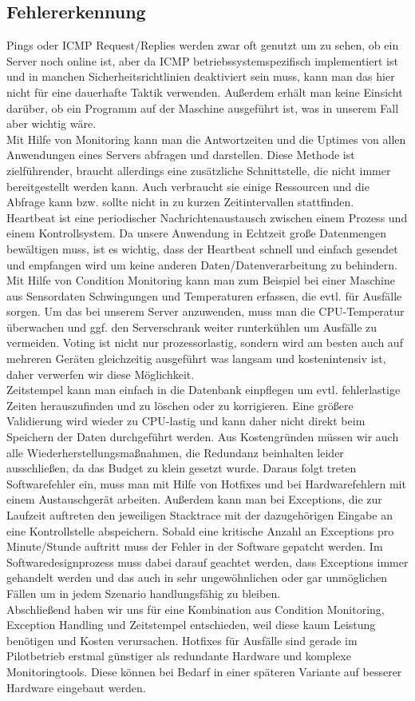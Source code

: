 \subsection{Fehlererkennung}
Pings oder ICMP Request/Replies werden zwar oft genutzt um zu sehen, ob ein Server noch online ist, aber da ICMP betriebssystemspezifisch implementiert ist und in manchen Sicherheitsrichtlinien deaktiviert sein muss, kann man das hier nicht für eine dauerhafte Taktik verwenden. Außerdem erhält man keine Einsicht darüber, ob ein Programm auf der Maschine ausgeführt ist, was in unserem Fall aber wichtig wäre. 
\\
Mit Hilfe von Monitoring kann man die Antwortzeiten und die Uptimes von allen Anwendungen eines Servers abfragen und darstellen. Diese Methode ist zielführender, braucht allerdings eine zusätzliche Schnittstelle, die nicht immer bereitgestellt werden kann. Auch verbraucht sie einige Ressourcen und die Abfrage kann bzw. sollte nicht in zu kurzen Zeitintervallen stattfinden. 
\\
Heartbeat ist eine periodischer Nachrichtenaustausch zwischen einem Prozess und einem Kontrollsystem. Da unsere Anwendung in Echtzeit große Datenmengen bewältigen muss, ist es wichtig, dass der Heartbeat schnell und einfach gesendet und empfangen wird um keine anderen Daten/Datenverarbeitung zu behindern. 
Mit Hilfe von Condition Monitoring kann man zum Beispiel bei einer Maschine aus Sensordaten Schwingungen und Temperaturen erfassen, die evtl. für Ausfälle sorgen. Um das bei unserem Server anzuwenden, muss man die CPU-Temperatur überwachen und ggf. den Serverschrank weiter runterkühlen um Ausfälle zu vermeiden. 
Voting ist nicht nur prozessorlastig, sondern wird am besten auch auf mehreren Geräten gleichzeitig ausgeführt was langsam und kostenintensiv ist, daher verwerfen wir diese Möglichkeit.
\\
Zeitstempel kann man einfach in die Datenbank einpflegen um evtl. fehlerlastige Zeiten herauszufinden und zu löschen oder zu korrigieren. Eine größere Validierung wird wieder zu CPU-lastig und kann daher nicht direkt beim Speichern der Daten durchgeführt werden.
Aus Kostengründen müssen wir auch alle Wiederherstellungsmaßnahmen, die Redundanz beinhalten leider ausschließen, da das Budget zu klein gesetzt wurde. Daraus folgt treten Softwarefehler ein, muss man mit Hilfe von Hotfixes und bei Hardwarefehlern mit einem Austauschgerät arbeiten. Außerdem kann man bei Exceptions, die zur Laufzeit auftreten den jeweiligen Stacktrace mit der dazugehörigen Eingabe an eine Kontrollstelle abspeichern. Sobald eine kritische Anzahl an Exceptions pro Minute/Stunde auftritt muss der Fehler in der Software gepatcht werden. Im Softwaredesignprozess muss dabei darauf geachtet werden, dass Exceptions immer gehandelt werden und das auch in sehr ungewöhnlichen oder gar unmöglichen Fällen um in jedem Szenario handlungsfähig zu bleiben.
\\
Abschließend haben wir uns für eine Kombination aus Condition Monitoring, Exception Handling und Zeitstempel entschieden, weil diese kaum Leistung benötigen und Kosten verursachen. Hotfixes für Ausfälle sind gerade im Pilotbetrieb erstmal günstiger als redundante Hardware und komplexe Monitoringtools. Diese können bei Bedarf in einer späteren Variante auf besserer Hardware eingebaut werden.

